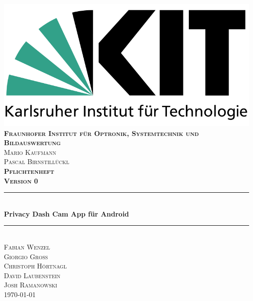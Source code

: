 \begin{titlepage}

\begin{center}

\includegraphics[width=0.5\linewidth]{subtopicsFuncspec/Res/KITLogo.png}\\[0.5cm]
  

\textsc{\bfseries Fraunhofer Institut für Optronik, Systemtechnik und Bildauswertung}\\[0.5cm]
\textsc{Mario Kaufmann\\Pascal Birnstill\"uckl}\\[2cm]

\textsc{\LARGE \bfseries Pflichtenheft}\\[0.5cm]
\textsc{\bfseries Version 0}\\[0.2cm]


\newcommand{\HRule}{\rule{\linewidth}{0.5mm}} 
{\color{mintgreen}\HRule} \\[0.4cm]
{\huge \bfseries Privacy Dash Cam App für Android}\\[0.4cm]
{\color{mintgreen}\HRule} \\[1cm]

\textsc{\Large Fabian Wenzel\\ Giorgio Groß\\ Christoph Hörtnagl\\ David Laubenstein\\[0.15cm]Josh Ramanowski} \\[2cm]

{\large \today}

\end{center}

\end{titlepage}